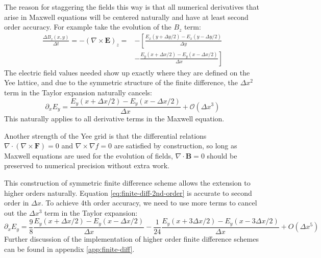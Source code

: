 The reason for staggering the fields this way is that all numerical derivatives
that arise in Maxwell equations will be centered naturally and have at least
second order accuracy. For example take the evolution of the $B_z$ term:
\begin{equation}
  \begin{split}
    \frac{\Delta B_z(x, y)}{\Delta t} = -(\nabla\times \mathbf{E})_{z} = &-\left[ \frac{E_x(y + \Delta y/2) - E_x(y - \Delta y/2)}{\Delta y} \right. \\
      &- \left.\frac{E_y(x + \Delta x/2) - E_y(x - \Delta x/2)}{\Delta x} \right]
  \end{split}
\end{equation}
The electric field values needed show up exactly where they are defined on
the Yee lattice, and due to the symmetric structure of the finite difference,
the $\Delta x^{2}$ term in the Taylor expansion naturally cancels:
\begin{equation}
  \label{eq:finite-diff-2nd-order}
\partial_xE_y = \frac{E_y(x + \Delta x/2) - E_y(x - \Delta x/2)}{\Delta x} + \mathcal{O}(\Delta x^3)
\end{equation}
This naturally applies to all derivative terms in the Maxwell equation.

Another strength of the Yee grid is that the differential relations
$\nabla\cdot(\nabla\times \mathbf{F}) = 0$ and $\nabla \times \nabla f = 0$ are
satisfied by construction, so long as Maxwell equations are used for the
evolution of fields, $\nabla\cdot \mathbf{B} = 0$ should be preserved to
numerical precision without extra work.

This construction of symmetric finite difference scheme allows the extension to
higher orders naturally. Equation \eqref{eq:finite-diff-2nd-order} is accurate
to second order in $\Delta x$. To achieve 4th order accuracy, we need to use
more terms to cancel out the $\Delta x^{3}$ term in the Taylor expansion:
\begin{equation}
  \label{eq:finite-diff-4th-order}
  \partial_{x}E_y = \frac{9}{8}\frac{E_y(x + \Delta x/2) - E_y(x - \Delta x / 2)}{\Delta x} - \frac{1}{24}\frac{E_y(x + 3\Delta x / 2) - E_y(x - 3\Delta x / 2)}{\Delta x} + O(\Delta x^5)
\end{equation}
Further discussion of the implementation of higher order finite difference
schemes can be found in appendix \ref{app:finite-diff}.

